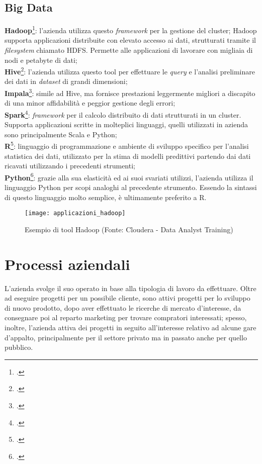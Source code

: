 \subsection{Big Data}
\textbf{Hadoop}\footcite{https://hadoop.apache.org/}: l'azienda utilizza questo \textit{framework} per la gestione del \gls{cluster}; Hadoop supporta applicazioni distribuite con elevato accesso ai dati, strutturati tramite il \textit{filesystem} chiamato \gls{HDFS}. Permette alle applicazioni di lavorare con migliaia di nodi e petabyte di dati;\\
\textbf{Hive}\footcite{https://hive.apache.org/}: l'azienda utilizza questo tool per effettuare le \textit{query} e l'analisi preliminare dei dati in \textit{dataset} di grandi dimensioni;\\
\textbf{Impala}\footcite{https://impala.apache.org/}: simile ad Hive, ma fornisce prestazioni leggermente migliori a discapito di una minor affidabilità e peggior gestione degli errori; \\
\textbf{Spark}\footcite{https://spark.apache.org/}: \textit{framework} per il calcolo distribuito di dati strutturati in un \gls{cluster}. Supporta applicazioni scritte in molteplici linguaggi, quelli utilizzati in azienda sono principalmente Scala e Python;\\
\textbf{R}\footcite{https://www.r-project.org/}: linguaggio di programmazione e ambiente di sviluppo specifico per l'analisi statistica dei dati, utilizzato per la stima di modelli predittivi partendo dai dati ricavati utilizzando i precedenti strumenti;\\
\textbf{Python}\footcite{https://www.python.org/}: grazie alla sua elasticità ed ai suoi svariati utilizzi, l'azienda utilizza il linguaggio Python per scopi analoghi al precedente strumento. Essendo la sintassi di questo linguaggio molto semplice, è ultimamente preferito a R.\\
\begin{figure}[!h] 
	\centering 
	\texttt{[image: applicazioni\_hadoop]} 
	\caption{Esempio di tool Hadoop (Fonte: Cloudera - Data Analyst Training)}
\end{figure}

\newpage
\section{Processi aziendali}

L'azienda svolge il suo operato in base alla tipologia di lavoro da effettuare. Oltre ad eseguire progetti per un possibile cliente, sono attivi progetti per lo sviluppo di nuovo prodotto, dopo aver effettuato le ricerche di mercato d'interesse, da consegnare poi al reparto marketing per trovare compratori interessati; spesso, inoltre, l'azienda attiva dei progetti in seguito all'interesse relativo ad alcune gare d'appalto, principalmente per il settore privato ma in passato anche per quello pubblico.

